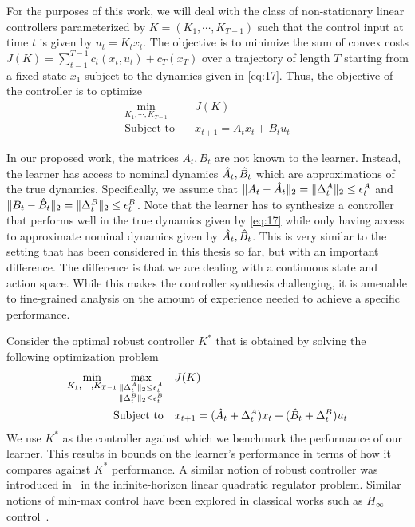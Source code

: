 For the purposes of this work, we will deal with the class of
non-stationary linear controllers parameterized by $K = (K_1, \cdots,
K_{T-1})$ such that the control input at time $t$ is given by $u_t =
K_tx_t$. The objective is to
minimize the sum of convex costs $J(K) = \sum_{t=1}^{T-1} c_t(x_t, u_t) +
c_T(x_T)$ over a
trajectory of length $T$ starting from a fixed state $x_1$ subject to
the dynamics given in
\eqref{eq:17}. Thus, the objective of the controller is to optimize
\begin{equation}
  \label{eq:18}
  \begin{aligned}
    \min_{K_1, \cdots, K_{T-1}} \quad & J(K) \\
    \textrm{Subject to} \quad & x_{t+1} = A_tx_t + B_tu_t
  \end{aligned}
\end{equation}

In our proposed work, the matrices $A_t, B_t$ are not known to the
learner. Instead, the learner has access to nominal dynamics $\hat{A}_t,
\hat{B}_t$ which are approximations of the true dynamics. Specifically,
we assume that $\|A_t - \hat{A}_t\|_2 = \|\Delta_t^A\|_2 \leq \epsilon_t^A$ and $\|B_t -
\hat{B}_t\|_2  = \|\Delta_t^B\|_2 \leq \epsilon_t^B$. Note that the learner has to
synthesize a controller that performs well in the true dynamics given
by \eqref{eq:17} while only having access to approximate nominal
dynamics given by $\hat{A}_t, \hat{B}_t$. This is very similar to the
setting that has been considered in this thesis so far, but with an
important difference. The difference is that we are dealing
with a continuous state and action space. While this makes the
controller synthesis challenging, it is amenable to fine-grained
analysis on the amount of experience needed to achieve a specific
performance.

Consider the optimal robust controller $K^*$ that
is obtained by solving the following optimization problem
\begin{equation}
  \label{eq:19}
  \begin{aligned}
    \min_{K_1, \cdots, K_{T-1}} \max_{\substack{\|\Delta_t^A\|_2 \leq
      \epsilon_t^A \\ \|\Delta_t^B\|_2 \leq \epsilon_t^B}}\quad & J(K) \\
    \textrm{Subject to} \quad & x_{t+1} = (\hat{A}_t + \Delta_t^A)x_t +
    (\hat{B}_t + \Delta_t^B)u_t
  \end{aligned}
\end{equation}
We use $K^*$ as the controller against which we benchmark the
performance of our learner. This results in bounds on the
learner's performance in terms of how it compares against $K^*$
performance. A similar notion of robust controller was introduced
in~\cite{DBLP:journals/focm/DeanMMRT20} in the infinite-horizon linear
quadratic regulator problem. Similar notions of min-max control have
been explored in
classical works such as $H_\infty$ control~\cite{10.5555/225507}.

